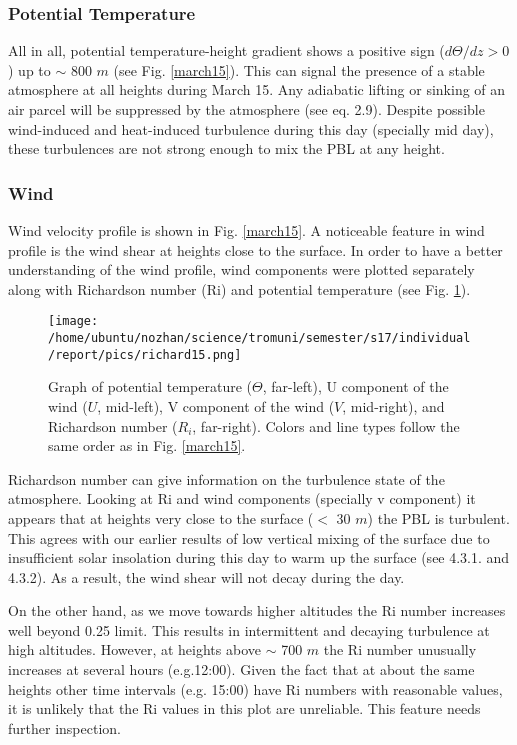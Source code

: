 \documentclass[a4paper,12pt]{article}
\numberwithin{equation}{section} %
\begin{document}
\subsubsection{Potential Temperature}

All in all, potential temperature-height gradient shows a positive sign ($d\Theta/dz > 0$) up to $\sim$ 800 $m$ (see Fig. \ref{march15}). This can signal the presence of a stable atmosphere at all heights during March 15. Any adiabatic lifting or sinking of an air parcel will be suppressed by the atmosphere (see eq. 2.9). Despite possible wind-induced and heat-induced turbulence during this day (specially mid day), these turbulences are not strong enough to mix the PBL at any height.

\subsubsection{Wind}

Wind velocity profile is shown in Fig. \ref{march15}. A noticeable feature in wind profile is the wind shear at heights close to the surface. In order to have a better understanding of the wind profile, wind components were plotted separately along with Richardson number (Ri) and potential temperature (see Fig. \ref{richard15}).

\begin{figure}[bhp]
\texttt{[image: /home/ubuntu/nozhan/science/tromuni/semester/s17/individual/report/pics/richard15.png]}
\caption{Graph of potential temperature ($\Theta$, far-left), U component of the wind ($U$, mid-left), V component of the wind ($V$, mid-right), and Richardson number ($R_i$, far-right). Colors and line types follow the same order as in Fig. \ref{march15}.}
\label{richard15}
\end{figure}

Richardson number can give information on the turbulence state of the atmosphere. Looking at Ri and wind components (specially v component) it appears that at heights very close to the surface ($<$ 30 $m$) the PBL is turbulent. This agrees with our earlier results of low vertical mixing of the surface due to insufficient solar insolation during this day to warm up the surface (see 4.3.1. and 4.3.2). As a result, the wind shear will not decay during the day.

On the other hand, as we move towards higher altitudes the Ri number increases well beyond 0.25 limit. This results in intermittent and decaying turbulence at high altitudes. However, at heights above $\sim$ 700 $m$ the Ri number unusually increases at several hours (e.g.12:00). Given the fact that at about the same heights other time intervals (e.g. 15:00) have Ri numbers with reasonable values, it is unlikely that the Ri values in this plot are unreliable. This feature needs further inspection. 
\end{document}
